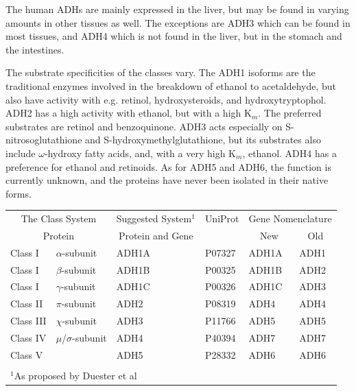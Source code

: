 \documentclass[a4paper, twoside, 12pt, openright]{report}
\begin{document}
The human ADHs are mainly expressed in the liver, but may be found in varying amounts in other tissues as well. The exceptions are ADH3 which can be found in most tissues, and ADH4 which is not found in the liver, but in the stomach and the intestines\cite{estonius_alcohol_1996}.

The substrate specificities of the classes vary. The ADH1 isoforms are the traditional enzymes involved in the breakdown of ethanol to acetaldehyde, but also have activity with e.g. retinol, hydroxysteroids, and hydroxytryptophol. ADH2 has a high activity with ethanol, but with a high K$_m$\cite{hoog_mammalian_2001-1}. The preferred substrates are retinol\cite{hellgren_alcohol_2007} and benzoquinone\cite{svensson_structural_1998}. ADH3 acts especially on S-nitrosoglutathione and S-hydroxymethylglutathione, but its substrates also include $\omega$-hydroxy fatty acids, and, with a very high K$_m$, ethanol\cite{staab_medium-_2008}. ADH4 has a preference for ethanol and retinoids\cite{chou_kinetic_2002}. As for ADH5 and ADH6, the function is currently unknown, and the proteins have never been isolated in their native forms.

\begin{table}[htb]
\begin{center}
{\begin{tabular}{llllll}
\toprule
\multicolumn{2}{c}{The Class System} & \multicolumn{1}{c}{Suggested System$^1$} & \multicolumn{1}{c}{UniProt} & \multicolumn{2}{c}{Gene Nomenclature}\\
\multicolumn{2}{c}{Protein} & \multicolumn{1}{c}{Protein and Gene} &  & \multicolumn{1}{c}{New} & \multicolumn{1}{c}{Old}\\
 \midrule
Class I & $\alpha$-subunit & ADH1A & P07327 & ADH1A & ADH1\\
Class I & $\beta$-subunit & ADH1B & P00325 & ADH1B & ADH2\\
Class I & $\gamma$-subunit & ADH1C & P00326 & ADH1C & ADH3\\
Class II & $\pi$-subunit & ADH2 & P08319 & ADH4 & ADH4\\
Class III & $\chi$-subunit & ADH3 & P11766 & ADH5 & ADH5\\
Class IV & $\mu$/$\sigma$-subunit & ADH4 & P40394 & ADH7 & ADH7\\
Class V & & ADH5 & P28332 & ADH6 & ADH6\\
\bottomrule
\\[-10pt]
\multicolumn{5}{l}{$^1$As proposed by Duester et al\cite{duester_recommended_1999}}
\end{tabular}}
\end{center}
\end{table} 
\end{document}
